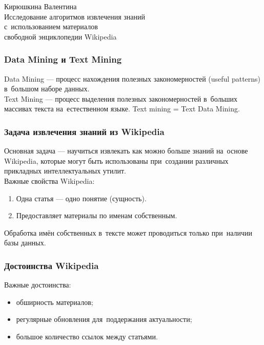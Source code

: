 \documentclass{beamer}
\begin{document}
\begin{frame}
\begin{center}
Кирюшкина Валентина \\
\vspace{1cm}
{\Large Исследование алгоритмов извлечения знаний \\
с~использованием материалов \\
свободной энциклопедии Wikipedia}\\ 
\end{center}
\end{frame}

\begin{frame}
\frametitle{Data Mining и Text Mining}
Data Mining --- процесс нахождения полезных закономерностей (useful patterns)  в~большом наборе данных.\\
\vspace{1cm}
Text Mining --- процесс выделения полезных закономерностей 
в~больших массивах текста на~естественном языке. 
Text mining = Text Data Mining.
\end{frame}

\begin{frame}
\frametitle{Задача извлечения знаний из Wikipedia}

Основная задача --- научиться извлекать как можно больше знаний на~основе Wikipedia,
которые могут быть использованы  при~создании различных прикладных интеллектуальных утилит.\\
\vspace{0.3cm}
Важные свойства Wikipedia:

\begin{enumerate}

\item {Одна статья --- одно понятие (сущность).}
\item{Предоставляет материалы по именам собственным.}

\end{enumerate}

Обработка имён собственных в~тексте может проводиться только при~наличии базы данных.

\end{frame}

\begin{frame}
\frametitle{Достоинства Wikipedia}

Важные достоинства:

\begin{itemize}
\item{обширность материалов;}
\item{регулярные обновления для~поддержания актуальности;}
\item{большое количество ссылок между статьями.}
\end{itemize}

\end{frame}
\end{document}
